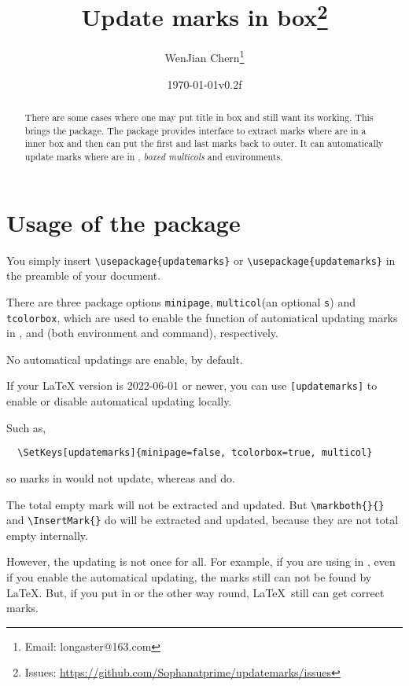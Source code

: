 \documentclass{l3doc}
\title{Update marks in box\thanks{Issues: \url{https://github.com/Sophanatprime/updatemarks/issues}}}
\author{WenJian Chern\thanks{Email: longaster@163.com}}
\date{\today\qquad v0.2f}
\begin{document}
\maketitle

\begin{abstract}
There are some cases where one may put title in box and still want its 
 working. This brings the  package.
The  package provides interface to extract marks where are in a 
inner box and then can put the first and last marks back to outer.
It can automatically update marks where are in , 
\textit{boxed multicols} and  environments.
\end{abstract}


\tableofcontents


\section{Usage of the package}

You simply insert \verb|\usepackage{updatemarks}| or 
\verb|\usepackage|\verb|{updatemarks}| in the preamble of your document.

There are three package options \texttt{minipage}, 
\texttt{multicol}(an optional \texttt s) and 
\texttt{tcolorbox}, which are used to enable the function of automatical updating marks
in ,  and 
 (both  environment and  command), respectively.

No automatical updatings are enable, by default.

If your {\LaTeX} version is 2022-06-01 or newer, you can use 
\texttt{[updatemarks]} to enable or disable
automatical updating locally.

Such as,
\begin{verbatim}
  \SetKeys[updatemarks]{minipage=false, tcolorbox=true, multicol}
\end{verbatim}
so marks in  would not update, 
whereas  and  do.

The total empty mark will not be extracted and updated.
But \verb|\markboth{}{}| and \verb|\InsertMark{}| do will be extracted and updated,
because they are not total empty internally.

However, the updating is not once for all.
For example, if you are using  in , even if you enable
the automatical updating, the marks still can not be found by \LaTeX.
But, if you put  in  or the other way round, 
\LaTeX\ still can get correct marks.
\end{document}
